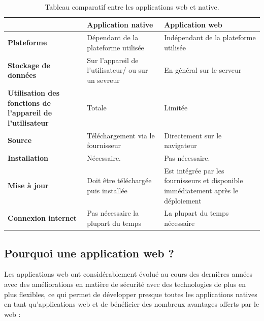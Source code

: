 \begin{table}[!h]
  \small
  \centering
  \footnotesize{
   \begin{tabular}{|p{4cm}|p{4cm}|p{4cm}|} %
    \hline
      & \textbf{Application native} & \textbf{Application web} \\
    \hline
   \textbf{Plateforme} & Dépendant de la plateforme utilisée & Indépendant de la plateforme utilisée \\
    \hline
    \textbf{Stockage de données} & Sur l’appareil de l’utilisateur/ ou sur un sevreur & En général sur le serveur \\
    \hline
    \textbf{Utilisation des fonctions de l’appareil de l’utilisateur} & Totale & Limitée \\
    \hline
    \textbf{Source} & Téléchargement via le fournisseur & Directement sur le navigateur \\
    \hline
    \textbf{Installation} & Nécessaire. & Pas nécessaire. \\
    \hline
    \textbf{Mise à jour} & Doit être téléchargée puis installée & Est intégrée par les fournisseurs et disponible immédiatement après le déploiement \\
    \hline
    \textbf{Connexion internet} & Pas nécessaire la plupart du temps & La plupart du temps nécessaire \\
    \hline
    \end{tabular}}
    \caption{Tableau comparatif entre les applications web et native.} 
    \label{tab1}
\end{table}
    
\subsection{Pourquoi une application web ?}
Les applications web ont considérablement évolué au cours des dernières années
avec des améliorations en matière de sécurité avec des technologies de plus en
plus flexibles, ce qui permet de développer presque toutes les applications
natives en tant qu’applications web et de bénéficier des nombreux avantages
offerts par le web :
        
